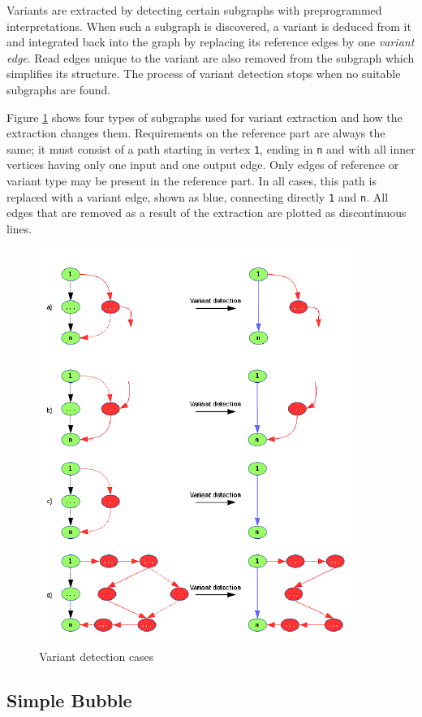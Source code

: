 Variants are extracted by detecting certain subgraphs with preprogrammed interpretations. When such a subgraph is discovered, a variant is deduced from it and integrated back into the graph by replacing its reference edges by one \textit{variant edge}. Read edges unique to the variant are also removed from the subgraph which simplifies its structure. The process of variant detection stops when no suitable subgraphs are found.

Figure \ref{fig:variant-detection} shows four types of subgraphs used for variant extraction and how the extraction changes them. Requirements on the reference part are always the same; it must consist of a path starting in vertex \texttt{1}, ending in \texttt{n} and with all inner vertices having only one input and one output edge. Only edges of reference or variant type may be present in the reference part. In all cases, this path is replaced with a variant edge, shown as blue, connecting directly \texttt{1} and \texttt{n}. All edges that are removed as a result of the extraction are plotted as discontinuous lines.

\begin{figure}[h]
	\centering
	\includegraphics{img/variant-detection.pdf}
	\caption{Variant detection cases}
	\label{fig:variant-detection}
\end{figure}

\subsection{Simple Bubble}
\label{subsec:simple-bubble}

